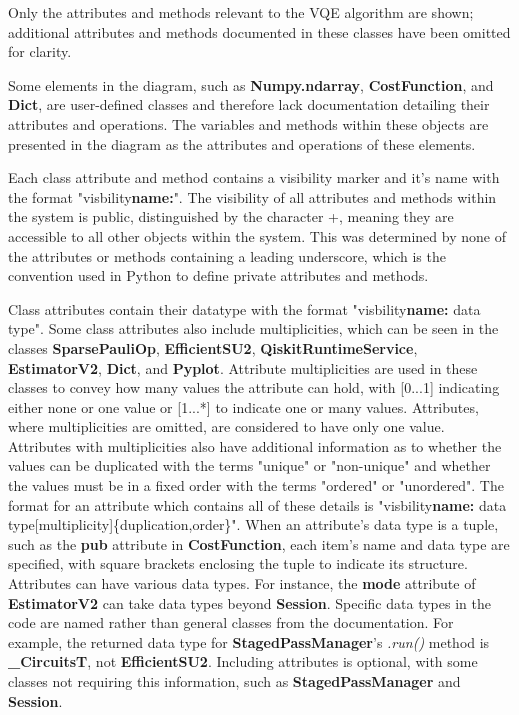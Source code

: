 \documentclass{article}
\begin{document}
Only the attributes and methods relevant to the VQE algorithm are shown; additional attributes and methods documented in these classes have been omitted for clarity.

Some elements in the diagram, such as \textbf{Numpy.ndarray}, \textbf{CostFunction}, and \textbf{Dict}, are user-defined classes and therefore lack documentation detailing their attributes and operations. The variables and methods within these objects are presented in the diagram as the attributes and operations of these elements.

Each class attribute and method contains a visibility marker and it's name with the format "visbility\textbf{name:}". The visibility of all attributes and methods within the system is public, distinguished by the character +, meaning they are accessible to all other objects within the system\cite{Seidl_Scholz_Huemer_Kappel_Duffy_2014}. This was determined by none of the attributes or methods containing a leading underscore, which is the convention used in Python to define private attributes and methods\cite{Privacy}.

Class attributes contain their datatype with the format "visbility\textbf{name:} data type". Some class attributes also include multiplicities, which can be seen in the classes \textbf{SparsePauliOp}, \textbf{EfficientSU2}, \textbf{QiskitRuntimeService}, \textbf{EstimatorV2}, \textbf{Dict}, and \textbf{Pyplot}. Attribute multiplicities are used in these classes to convey how many values the attribute can hold\cite{Seidl_Scholz_Huemer_Kappel_Duffy_2014}, with [0...1] indicating either none or one value or [1...*] to indicate one or many values. Attributes, where multiplicities are omitted, are considered to have only one value\cite{Seidl_Scholz_Huemer_Kappel_Duffy_2014}. Attributes with multiplicities also have additional information as to whether the values can be duplicated with the terms "unique" or "non-unique" and whether the values must be in a fixed order with the terms "ordered" or "unordered"\cite{Seidl_Scholz_Huemer_Kappel_Duffy_2014}. The format for an attribute which contains all of these details is "visbility\textbf{name:} data type[multiplicity]\{duplication,order\}". When an attribute's data type is a tuple, such as the \textbf{pub} attribute in \textbf{CostFunction}, each item's name and data type are specified, with square brackets enclosing the tuple to indicate its structure. Attributes can have various data types. For instance, the \textbf{mode} attribute of \textbf{EstimatorV2} can take data types beyond \textbf{Session}. Specific data types in the code are named rather than general classes from the documentation. For example, the returned data type for \textbf{StagedPassManager}'s \textit{.run()} method is \textbf{\_CircuitsT}, not \textbf{EfficientSU2}\cite{StagedPassManager}. Including attributes is optional, with some classes not requiring this information, such as \textbf{StagedPassManager} and \textbf{Session}. 
\end{document}
